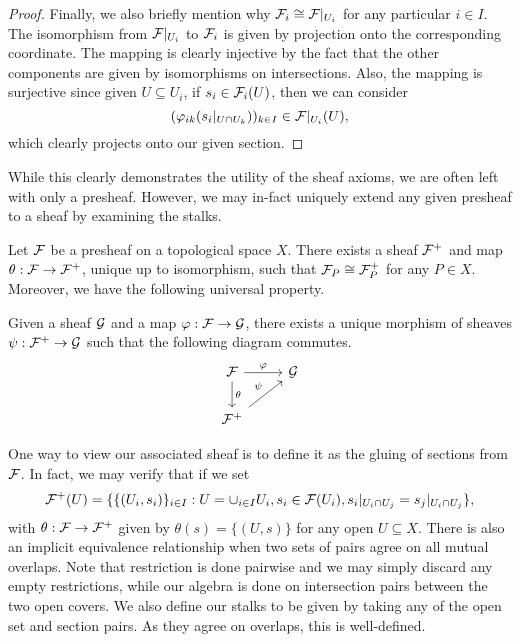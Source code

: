 \documentclass[12pt]{article}
\begin{document}
\begin{proof}
    Finally, we also briefly mention why $\mathcal{F}_i \cong \mathcal{F}|_{U_i}$ for any particular $i \in I$.
    The isomorphism from $\mathcal{F}|_{U_i}$ to $\mathcal{F}_i$ is given by projection onto the corresponding coordinate.
    The mapping is clearly injective by the fact that the other components are given by isomorphisms on intersections. 
    Also, the mapping is surjective since given $U \subseteq U_i$, if $s_i \in \mathcal{F}_i(U)$, then we can consider
    \[
        (\varphi_{ik}(s_i|_{U \cap U_k}))_{k \in I} \in \mathcal{F}|_{U_i}(U),
    \]
    which clearly projects onto our given section.
    \qedhere
    
\end{proof}

While this clearly demonstrates the utility of the sheaf axioms, 
we are often left with only a presheaf.
However, we may in-fact uniquely extend any given presheaf to a sheaf by examining the stalks.

\begin{theorem}
    Let $\mathcal{F}$ be a presheaf on a topological space $X$.
    There exists a sheaf $\mathcal{F}^+$ and map $\theta : \mathcal{F} \to \mathcal{F}^+$, 
    unique up to isomorphism, such that $\mathcal{F}_P \cong \mathcal{F}^+_P$ for any $P \in X$.
    Moreover, we have the following universal property. 
    
    Given a sheaf $\mathcal{G}$ and a map $\varphi : \mathcal{F} \to \mathcal{G}$, 
    there exists a unique morphism of sheaves $\psi : \mathcal{F}^+ \to \mathcal{G}$ such that the following diagram commutes.
    \[
        \begin{tikzcd}
            \cF \arrow[r, "\varphi"] \arrow[d, "\theta"] & \cG \\
            \cF^+ \arrow[ur, "\psi"]
        \end{tikzcd}
    \]
\end{theorem}

One way to view our associated sheaf is to define it as the gluing of sections from $\mathcal{F}$.
In fact, we may verify that if we set 
\[
    \mathcal{F}^+(U) = \{\{(U_i, s_i)\}_{i \in I} : 
        U = \cup_{i \in I} U_i, 
        s_i \in \mathcal{F}(U_i), 
        s_i|_{U_i \cap U_j} = s_j|_{U_i \cap U_j}
    \},
\]
with $\theta : \mathcal{F} \to \mathcal{F}^+$ given by $\theta(s) = \{(U, s)\}$ for any open $U \subseteq X$.
There is also an implicit equivalence relationship when two sets of pairs agree on all mutual overlaps.
Note that restriction is done pairwise and we may simply discard any empty restrictions,
while our algebra is done on intersection pairs between the two open covers.
We also define our stalks to be given by taking any of the open set and section pairs.
As they agree on overlaps, this is well-defined. 
\end{document}
